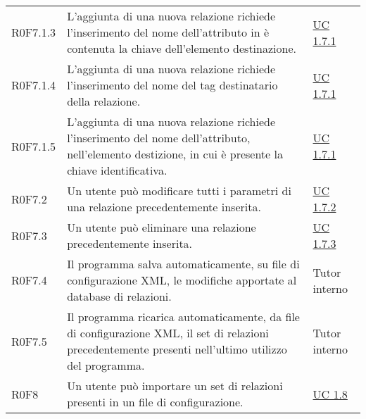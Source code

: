 \begin{center}
\begin{longtable}{p{4.2cm}!{\color{white}\vrule width 0.5mm}p{6cm}!{\color{white}\vrule width 0.5mm}p{2.5cm}!{\color{white}\vrule width 0.5mm}}
				\hspace{4mm}\hypertarget{XER0F7.1.3}{R0F7.1.3} & L'aggiunta di una nuova relazione richiede l'inserimento del nome dell'attributo in è contenuta la chiave dell'elemento destinazione. & \hyperref[subsec:XEUC1.7.1]{UC 1.7.1}\\
					
				\hspace{4mm}\hypertarget{XER0F7.1.4}{R0F7.1.4} & L'aggiunta di una nuova relazione richiede l'inserimento del nome del tag destinatario della relazione. & \hyperref[subsec:XEUC1.7.1]{UC 1.7.1}\\
						
				\hspace{4mm}\hypertarget{XER0F7.1.5}{R0F7.1.5} & L'aggiunta di una nuova relazione richiede l'inserimento del nome dell'attributo, nell'elemento destizione, in cui è presente la chiave identificativa. & \hyperref[subsec:XEUC1.7.1]{UC 1.7.1}\\	
				
			
			\hspace{2mm}\hypertarget{XER0F7.2}{R0F7.2} & Un utente può modificare tutti i parametri di una relazione precedentemente inserita. & \hyperref[subsec:XEUC1.7.2]{UC 1.7.2}\\
		
			\hspace{2mm}\hypertarget{XER0F7.3}{R0F7.3} & Un utente può eliminare una relazione precedentemente inserita. & \hyperref[subsec:XEUC1.7.3]{UC 1.7.3}\\
		
			\hspace{2mm}\hypertarget{XER0F7.4}{R0F7.4} & Il programma salva automaticamente, su file di configurazione XML, le modifiche apportate al database di relazioni. & Tutor interno\\
		
			\hspace{2mm}\hypertarget{XER0F7.5}{R0F7.5} & Il programma ricarica automaticamente, da file di configurazione XML, il set di relazioni precedentemente presenti nell'ultimo utilizzo del programma. & Tutor interno\\
			
		
		\hspace{0mm}\hypertarget{XER0F8}{R0F8} & Un utente può importare un set di relazioni presenti in un file di configurazione. & \hyperref[subsec:XEUC1.8]{UC 1.8}\\
		

\end{longtable}
\end{center}
